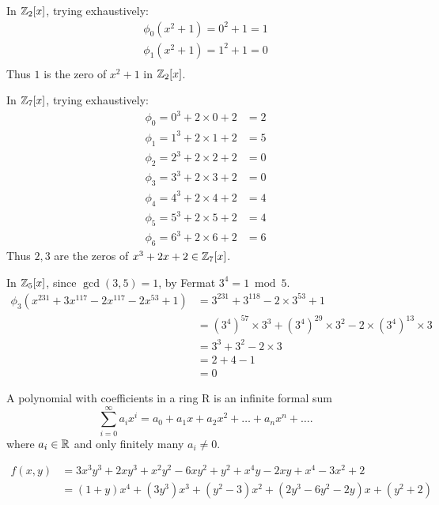 \documentclass[class=article,crop=false]{standalone}
\begin{document}
\begin{problem}[22.12]
	In $ \mathbb{Z}_2[x]$, trying exhaustively:
\begin{align*}
	\phi_0(x^2+1) = 0^2 + 1 = 1\\
	\phi_1(x^2+1) = 1^2 + 1 = 0\\
\end{align*}
Thus $ 1$ is the zero of  $ x^2+1$ in $ \mathbb{Z}_2[x]$.
\end{problem}

\begin{problem}[22.13]
	In $ \mathbb{Z}_7[x]$, trying exhaustively:
\begin{align*}
	\phi_0 = 0 ^3 + 2 \times 0 + 2 &= 2 \\
	\phi_1 = 1^3 + 2\times 1+ 2 &= 5 \\
	\phi_2 = 2^3 + 2 \times 2 + 2 &= 0 \\
	\phi_3 = 3^3 + 2\times 3 + 2 &= 0 \\ 
	\phi_4 = 4^3 + 2\times 4 + 2 &=4\\
	\phi_5 = 5^{3} + 2\times 5 +2 &= 4 \\
	\phi_6 = 6^{3} + 2\times 6 + 2 &=6
\end{align*}
Thus $ 2,3$ are the zeros of  $ x^3 + 2x+2 \in \mathbb{Z}_7[x]$.
\end{problem}

\begin{problem}[22.16]
	In $ \mathbb{Z}_5[x]$, since $ \gcd ( 3,5)=1 $, by Fermat $ 3^{4} = 1 \bmod 5$. 
	\begin{align*}
		\phi_3(x^{231}+ 3x^{117}-2x^{117}-2x^{53}+ 1) &= 3^{231} + 3^{118} - 2 \times 3^{53} + 1 \\
							      &= (3^{4})^{57} \times 3^3 + (3^{4})^{29} \times 3^2 - 2\times (3^{4})^{13} \times 3 \\
							      &= 3^{3} + 3^2 - 2\times 3 \\
							      &= 2+4-1  \\
							      &= 0 
	\end{align*}	
\end{problem}
\begin{problem}[22.18]
	A polynomial with coefficients in a ring R is an infinite formal sum
	\[
	\sum_{ i= 0}^{\infty} a_i x^{i}= a_0+a_1 x+ a_2 x^2 + \ldots + a_n x^{n} +\ldots
	.\] 
	where $ a_i \in \mathbb{R}$ and only finitely many $ a_i \neq 0$.
\end{problem}

\begin{problem}[22.20]
\begin{align*}
	f(x,y) &= 3x^3y^3 + 2xy^3 + x^2y^2 - 6xy^2 + y^2 + x^{4} y - 2xy + x^{4} -3x^2 + 2 \\
	       &= (1+y)x^{4} + (3y^3)x^3 + (y^2 -3) x^2 + (2y^3 - 6 y^2- 2y)x+ (y^2 + 2)
\end{align*}
\end{problem}
\end{document}
